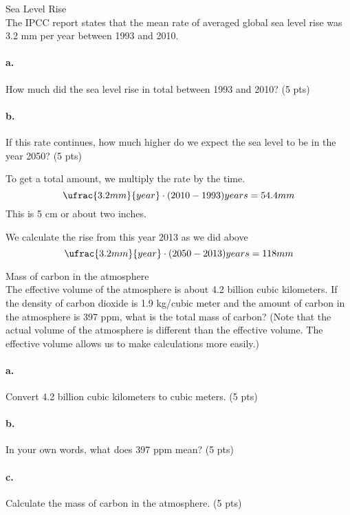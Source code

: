 
Sea Level Rise \\

The IPCC report states that the mean rate of averaged global sea level
rise was 3.2 mm per year between 1993 and 2010.

\paragraph{a.} How much did the sea level rise in total between 1993 and 2010? (5
pts)

\paragraph{b.} If this rate continues, how much higher do we expect the sea level to
be in the year 2050? (5 pts)

To get a total amount, we multiply the rate by the time.
$$ \ufrac{3.2 mm}{year} \cdot (2010 - 1993) years = 54.4 mm $$
This is 5 cm or about two inches.

We calculate the rise from this year 2013 as we did above
$$ \ufrac{3.2 mm}{year} \cdot (2050 - 2013) years =  118 mm $$


Mass of carbon in the atmosphere \\

The effective volume of the atmosphere is about 4.2 billion cubic
kilometers.  If the density of carbon dioxide is 1.9 kg/cubic meter and
the amount of carbon in the atmosphere is 397 ppm, what is the total
mass of carbon?  (Note that the actual volume of the atmosphere is different
than the effective volume.  The effective volume allows us to make
calculations more easily.)

\paragraph{a.} Convert 4.2 billion cubic kilometers to cubic meters. (5 pts)

\paragraph{b.} In your own words, what does 397 ppm mean? (5 pts)

\paragraph{c.} Calculate the mass of carbon in the atmosphere. (5 pts)

